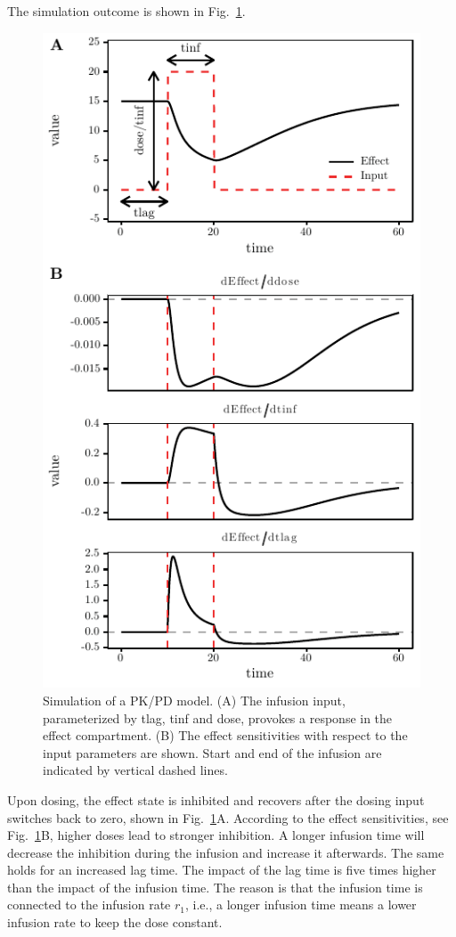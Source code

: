 \documentclass[journal, a4paper]{IEEEtran}
\begin{document}
The simulation outcome is shown in Fig.~\ref{fig:simulation}. 
\begin{figure}[ht]
    \centering
    \includegraphics{example.pdf}
    \caption{Simulation of a PK/PD model. (A) The infusion input, parameterized by tlag, tinf and dose, provokes a response in the effect compartment. (B) The effect sensitivities with respect to the input parameters are shown. Start and end of the infusion are indicated by vertical dashed lines.}
    \label{fig:simulation}
\end{figure}
Upon dosing, the effect state is inhibited and recovers after the dosing input switches back to zero, shown in Fig.~\ref{fig:simulation}A. According to the effect sensitivities, see Fig.~\ref{fig:simulation}B, higher doses lead to stronger inhibition. A longer infusion time will decrease the inhibition during the infusion and increase it afterwards. The same holds for an increased lag time. The impact of the lag time is five times higher than the impact of the infusion time. The reason is that the infusion time is connected to the infusion rate $r_1$, i.e., a longer infusion time means a lower infusion rate to keep the dose constant.
\end{document}
